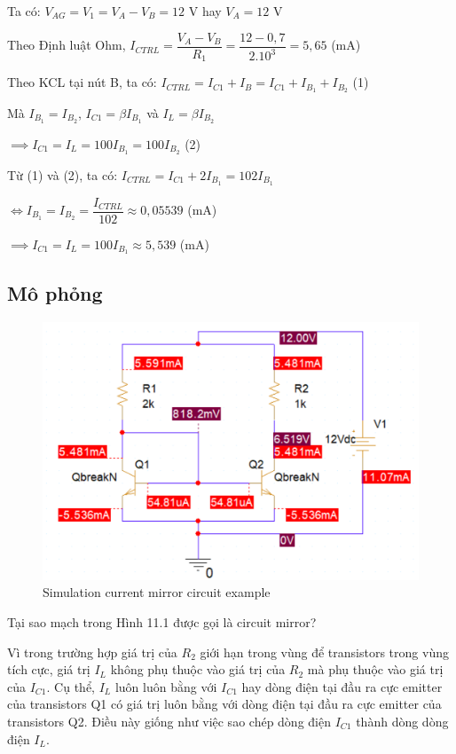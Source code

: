  Ta có: \(V_{AG} = V_1 = V_A - V_B = 12 \) V hay \(V_A = 12\) V

 Theo Định luật Ohm, \(I_{CTRL} = \dfrac{V_A - V_B}{R_1} = \dfrac{12 - 0,7}{2.10^3} = 5,65 \) (mA)

 Theo KCL tại nút B, ta có: \(I_{CTRL} = I_{C1} + I_B = I_{C1} + I_{B_1} + I_{B_2}\) (1)

 Mà \(I_{B_1} = I_{B_2}\), \(I_{C1} = \beta I_{B_1}\) và \(I_{L} = \beta I_{B_2}\)
 
 \(\implies I_{C1} = I_L = 100I_{B_1} = 100I_{B_2}\) (2)

 Từ (1) và (2), ta có: \(I_{CTRL} = I_{C1} + 2I_{B_1} = 102I_{B_1}\)

 \(\iff I_{B_1} = I_{B_2} = \dfrac{I_{CTRL}}{102} \approx 0,05539 \) (mA)

 \(\implies I_{C1} = I_L = 100I_{B_1} \approx 5,539\) (mA)

 \subsection{Mô phỏng}
 
 \begin{figure}[ht]
    \centering
    \includegraphics[scale=0.3]{graphics/ex11/f2.png}
    \caption{Simulation current mirror circuit example}
\end{figure}

Tại sao mạch trong Hình 11.1 được gọi là circuit mirror?

Vì trong trường hợp giá trị của \(R_2\) giới hạn trong vùng để transistors trong vùng tích cực, giá trị \(I_L\) không phụ thuộc vào giá trị của \(R_2\)
mà phụ thuộc vào giá trị của \(I_{C1}\). Cụ thể, \(I_L\) luôn luôn bằng với \(I_{C1}\) hay dòng điện tại đầu ra cực emitter của transistors Q1 
có giá trị luôn bằng với dòng điện tại đầu ra cực emitter của transistors Q2. Điều này giống như việc sao chép dòng điện \(I_{C1}\) thành dòng dòng điện \(I_{L}\).

